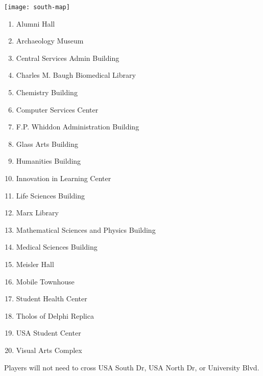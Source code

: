 \documentclass{../puzzlehunt}
\title{\phEventName}
\author{Mathematical Puzzle Programs}
\date{\today}
\begin{document}




\begin{center}
  \texttt{[image: south-map]}
\end{center}

\begin{multicols}{2}
  \begin{enumerate}
    \item Alumni Hall
    \item Archaeology Museum
    \item Central Services Admin Building %
    \item Charles M. Baugh Biomedical Library
    \item Chemistry Building
    \item Computer Services Center
    \item F.P. Whiddon Administration Building %
    \item Glass Arts Building %
    \item Humanities Building
    \item Innovation in Learning Center
    \item Life Sciences Building
    \item Marx Library
    \item Mathematical Sciences and Physics Building
    \item Medical Sciences Building
    \item Meisler Hall %
    \item Mobile Townhouse
    \item Student Health Center
    \item Tholos of Delphi Replica
    \item USA Student Center
    \item Visual Arts Complex
  \end{enumerate}
\end{multicols}

Players will not need to cross USA South Dr, USA North Dr, or University Blvd.
\end{document}
